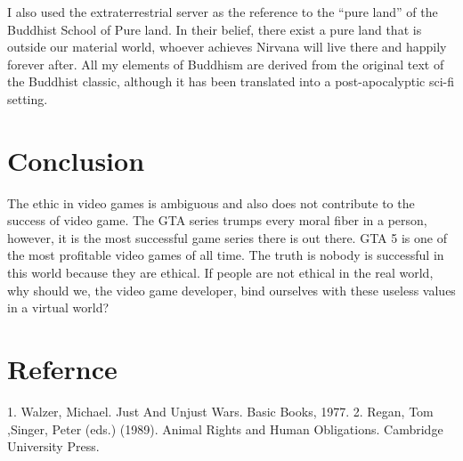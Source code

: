 \documentclass[10pt,twocolumn]{article}
\begin{document}
 I  also used the extraterrestrial server as the reference to the “pure land” of the Buddhist School of Pure land. In their belief, there exist a pure land that is outside our material world, whoever achieves Nirvana will live there and happily forever after. All my elements of Buddhism are derived from the original text of the Buddhist classic, although it has been translated into a post-apocalyptic sci-fi setting.

\section{Conclusion }
The ethic in video games is ambiguous and also does not contribute to the success of video game. The GTA series trumps every moral fiber in a person, however, it is the most successful game series there is out there. GTA 5 is one of the most profitable video games of all time. The truth is nobody is successful in this world because they are ethical. If people are not ethical in the real world, why should we, the video game developer, bind ourselves with these useless values in a virtual world?   
\section{Refernce}
1.  Walzer, Michael. Just And Unjust Wars. Basic Books, 1977.
2. Regan, Tom ,Singer, Peter (eds.) (1989). Animal Rights and Human Obligations. Cambridge University Press.
\end{document}
